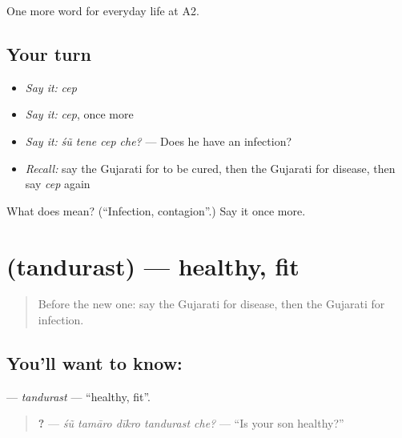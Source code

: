 \begin{grammarlens}[title={What you've built}]
One more word for everyday life at A2.
\end{grammarlens}

\subsection*{Your turn}
\begin{itemize}
\raggedright
  \item \emph{Say it:} \emph{cep}
  \item \emph{Say it:} \emph{cep}, once more
  \item \emph{Say it:} \emph{śũ tene cep che?} — Does he have an infection?
  \item \emph{Recall:} say the Gujarati for to be cured, then the Gujarati for disease, then say \emph{cep} again
\end{itemize}

\begin{tcolorbox}[breakable,colback=teal!4,colframe=teal!35!black,title={Before you move on}]
What does  mean? (\textquotedblleft{}Infection, contagion\textquotedblright{}.) Say it once more.
\end{tcolorbox}
\section[\texorpdfstring{\gu{તંદુરસ્ત} (tandurast)}{તંદુરસ્ત (tandurast)}]{ (tandurast) — healthy, fit}

\label{lesson:GU-C232-tandurast}



\begin{quote}
Before the new one: say the Gujarati for disease, then the Gujarati for infection.
\end{quote}

\subsection*{You'll want to know: }
\textbf{} — \emph{tandurast} — \textquotedblleft{}healthy, fit\textquotedblright{}.

\begin{quote}
\textbf{    ?} — \emph{śũ tamāro dīkro tandurast che?} — \textquotedblleft{}Is your son healthy?\textquotedblright{}
\end{quote}

